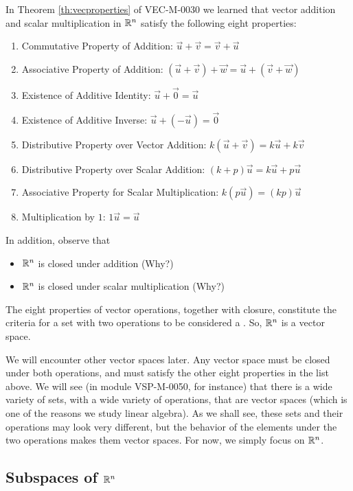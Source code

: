 \documentclass{ximera}
\begin{document}
In Theorem \ref{th:vecproperties} of VEC-M-0030 we learned that vector addition and scalar multiplication in $\mathbb{R}^n$ satisfy the following eight properties:
\begin{enumerate}
 \item 
  Commutative Property of Addition:\quad
  $\vec{u}+\vec{v}=\vec{v}+\vec{u}$
  \item 
  Associative Property of Addition:\quad
  $(\vec{u}+\vec{v})+\vec{w}=\vec{u}+(\vec{v}+\vec{w})$
  \item 
  Existence of Additive Identity:\quad
  $\vec{u}+\vec{0}=\vec{u}$
  \item 
  Existence of Additive Inverse:\quad
  $\vec{u}+(-\vec{u})=\vec{0}$
  \item
  Distributive Property over Vector Addition:\quad
  $k(\vec{u}+\vec{v})=k\vec{u}+k\vec{v}$
  \item
  Distributive Property over Scalar Addition:\quad
  $(k+p)\vec{u}=k\vec{u}+p\vec{u}$
  \item 
  Associative Property for Scalar Multiplication:\quad
  $k(p\vec{u})=(kp)\vec{u}$
  \item 
  Multiplication by $1$:\quad
  $1\vec{u}=\vec{u}$
  \end{enumerate}


  
  In addition, observe that  
  \begin{itemize}
      \item[]  $\mathbb{R}^n$ is closed under addition (Why?)
      \item[] $\mathbb{R}^n$ is closed under scalar multiplication (Why?)
\end{itemize}      
      The eight properties of vector operations, together with closure, constitute the criteria for a set with two operations to be considered a . So, $\mathbb{R}^n$ is a vector space.  
      
      We will encounter other vector spaces later. Any vector space must be closed under both operations, and must satisfy the other eight properties in the list above.  We will see (in module VSP-M-0050, for instance) that there is a wide variety of sets, with a wide variety of operations, that are vector spaces (which is one of the reasons we study linear algebra).  As we shall see, these sets and their operations may look very different, but the behavior of the elements under the two operations makes them vector spaces.  For now, we simply focus on $\mathbb{R}^n$.


\subsection*{Subspaces of $\mathbb{R}^n$}
\end{document}
